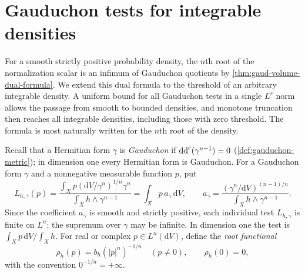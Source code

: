 \section{Gauduchon tests for integrable densities}
\label{sec:integrable-gauduchon-tests}

For a smooth strictly positive probability density, the $n$th root of the normalization scalar is an infimum of Gauduchon quotients by \cref{thm:gaud-volume-dual-formula}. We extend this dual formula to the threshold of an arbitrary integrable density. A uniform bound for all Gauduchon tests in a single $L^r$ norm allows the passage from smooth to bounded densities, and monotone truncation then reaches all integrable densities, including those with zero threshold. The formula is most naturally written for the $n$th root of the density.

Recall that a Hermitian form $\gamma$ is \emph{Gauduchon} if $\mathrm{dd}^{\mathrm{c}}(\gamma^{n-1})=0$ (\cref{def:gauduchon-metric}); in dimension one every Hermitian form is Gauduchon. For a Gauduchon form $\gamma$ and a nonnegative measurable function $p$, put
\[
 L_{h,\gamma}(p)=
 \frac{\displaystyle\int_Xp(\mathrm{d}V/\gamma^n)^{1/n}\gamma^n}
      {\displaystyle\int_Xh\wedge\gamma^{n-1}}
 =\int_Xp\,a_\gamma\,\mathrm{d}V,
 \qquad
 a_\gamma=\frac{(\gamma^n/\mathrm{d}V)^{(n-1)/n}}{\int_Xh\wedge\gamma^{n-1}}.
\]
Since the coefficient $a_\gamma$ is smooth and strictly positive, each individual test $L_{h,\gamma}$ is finite on $L^n$; the supremum over $\gamma$ may be infinite. In dimension one the test is $\int_Xp\,\mathrm{d}V/\int_Xh$. For real or complex $p\in L^n(\mathrm{d}V)$, define the \emph{root functional}
\[
 \rho_h(p)=b_h(|p|^n)^{-1/n}\quad(p\ne0),\qquad\rho_h(0)=0,
\]
with the convention $0^{-1/n}=+\infty$.

